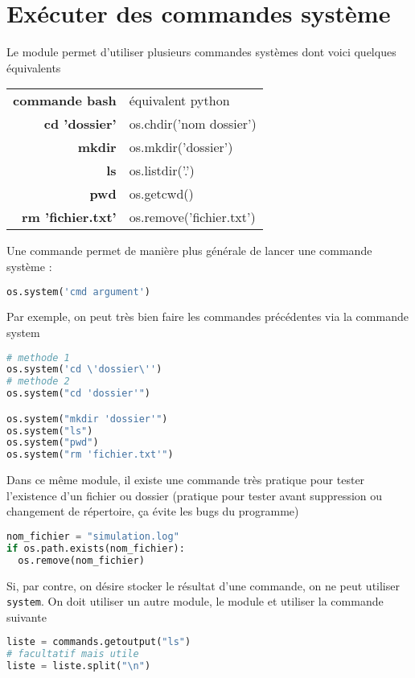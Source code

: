 \documentclass[a4paper,twoside]{article}
\begin{document}
\section{Exécuter des commandes système}
Le module  permet d'utiliser plusieurs commandes systèmes dont voici quelques équivalents

\begin{tabular}{>{\bfseries}r<{}@{ : }p{11cm}}
commande bash & équivalent python\\
cd 'dossier' & os.chdir('nom dossier')\\
mkdir & os.mkdir('dossier')\\
ls & os.listdir('.')\\
pwd & os.getcwd()\\
rm 'fichier.txt' & os.remove('fichier.txt')
\end{tabular}

Une commande permet de manière plus générale de lancer une commande système :
\begin{lstlisting}[language=python]
os.system('cmd argument')
\end{lstlisting}

Par exemple, on peut très bien faire les commandes précédentes via la commande system
\begin{lstlisting}[language=python]
# methode 1
os.system('cd \'dossier\'')
# methode 2
os.system("cd 'dossier'")

os.system("mkdir 'dossier'")
os.system("ls")
os.system("pwd")
os.system("rm 'fichier.txt'")
\end{lstlisting}

Dans ce même module, il existe une commande très pratique pour tester l'existence d'un fichier ou dossier (pratique pour tester avant suppression ou changement de répertoire, ça évite les bugs du programme)
\begin{lstlisting}[language=python]
nom_fichier = "simulation.log"
if os.path.exists(nom_fichier):
  os.remove(nom_fichier)
\end{lstlisting}


Si, par contre, on désire stocker le résultat d'une commande, on ne peut utiliser \texttt{system}. On doit utiliser un autre module, le module  et utiliser la commande suivante
\begin{lstlisting}[language=python]
liste = commands.getoutput("ls")
# facultatif mais utile
liste = liste.split("\n")
\end{lstlisting}
\end{document}
